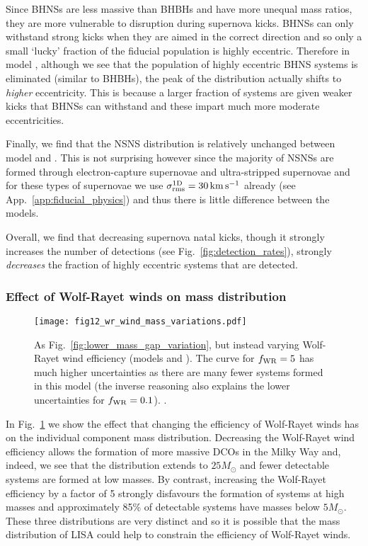 Since BHNSs are less massive than BHBHs and have more unequal mass ratios, they are more vulnerable to disruption during supernova kicks. BHNSs can only withstand strong kicks when they are aimed in the correct direction and so only a small `lucky' fraction of the fiducial population is highly eccentric. Therefore in model \modSigLower{}, although we see that the population of highly eccentric BHNS systems is eliminated (similar to BHBHs), the peak of the distribution actually shifts to \textit{higher} eccentricity. This is because a larger fraction of systems are given weaker kicks that BHNSs can withstand and these impart much more moderate eccentricities.

Finally, we find that the NSNS distribution is relatively unchanged between model \modFid{} and \modSigLower{}. This is not surprising however since the majority of NSNSs are formed through electron-capture supernovae and ultra-stripped supernovae and for these types of supernovae we use $\sigma^{\rm 1D}_{\rm rms} = 30 \unit{km}{s^{-1}}$ already (see App.~\ref{app:fiducial_physics}) and thus there is little difference between the models.

Overall, we find that decreasing supernova natal kicks, though it strongly increases the number of detections (see Fig.~\ref{fig:detection_rates}), strongly \textit{decreases} the fraction of highly eccentric systems that are detected.

\subsubsection{Effect of Wolf-Rayet winds on mass distribution}

\begin{figure}[tb]
    \centering
    \texttt{[image: fig12\_wr\_wind\_mass\_variations.pdf]}
    \caption{As Fig.~\ref{fig:lower_mass_gap_variation}, but instead varying Wolf-Rayet wind efficiency (models \modWRLow{} and \modWRHigh{}). The curve for $f_{\rm WR} = 5$ has much higher uncertainties as there are many fewer systems formed in this model (the inverse reasoning also explains the lower uncertainties for $f_{\rm WR} = 0.1$). \href{https://github.com/TomWagg/detecting-DCOs-in-LISA/blob/main/paper/figures/fig12_wr_wind_mass_variations.pdf}{\faFileImage} \href{https://github.com/TomWagg/detecting-DCOs-in-LISA/blob/main/paper/figure_notebooks/variations.ipynb}{\faBook}.}
    \label{fig:wr_wind_mass_variations}
\end{figure}

In Fig.~\ref{fig:wr_wind_mass_variations} we show the effect that changing the efficiency of Wolf-Rayet winds has on the individual component mass distribution. Decreasing the Wolf-Rayet wind efficiency allows the formation of more massive DCOs in the Milky Way and, indeed, we see that the distribution extends to $25 \unit{M_{\odot}}$ and fewer detectable systems are formed at low masses. By contrast, increasing the Wolf-Rayet efficiency by a factor of 5 strongly disfavours the formation of systems at high masses and approximately 85\% of detectable systems have masses below $5 \unit{M_{\odot}}$. These three distributions are very distinct and so it is possible that the mass distribution of LISA could help to constrain the efficiency of Wolf-Rayet winds.
